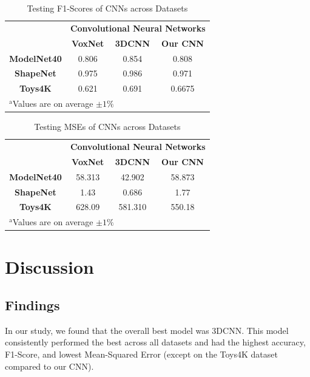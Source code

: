 \documentclass[conference]{IEEEtran}
\newcommand{\ra}[1]{\renewcommand{\arraystretch}{#1}}
\begin{document}
\begin{table}[htbp]
    \caption{Testing F1-Scores of CNNs across Datasets}
    \ra{1.2}
    \begin{center}
    \begin{tabular}{|c|c|c|c|}
    \hline
    &\multicolumn{3}{|c|}{\textbf{Convolutional Neural Networks}} \\
    \cline{2-4}
    & \textbf{VoxNet} & \textbf{3DCNN} & \textbf{Our CNN} \\
    \hline
    \textbf{ModelNet40} & 0.806 & 0.854 & 0.808 \\
    \hline
    \textbf{ShapeNet} & 0.975 & 0.986 & 0.971 \\
    \hline
    \textbf{Toys4K} & 0.621 & 0.691 & 0.6675 \\
    \hline
    \multicolumn{4}{l}{$^{\mathrm{a}}$Values are on average $\pm 1\%$}.
    \end{tabular}
    \label{tab2}
    \end{center}
\end{table}

\begin{table}[htbp]
    \caption{Testing MSEs of CNNs across Datasets}
    \ra{1.2}
    \begin{center}
    \begin{tabular}{|c|c|c|c|}
    \hline
    &\multicolumn{3}{|c|}{\textbf{Convolutional Neural Networks}} \\
    \cline{2-4}
    & \textbf{VoxNet} & \textbf{3DCNN} & \textbf{Our CNN} \\
    \hline
    \textbf{ModelNet40} & 58.313 & 42.902 & 58.873 \\
    \hline
    \textbf{ShapeNet} & 1.43 & 0.686 & 1.77 \\
    \hline
    \textbf{Toys4K} & 628.09 & 581.310 & 550.18 \\
    \hline
    \multicolumn{4}{l}{$^{\mathrm{a}}$Values are on average $\pm 1\%$}.
    \end{tabular}
    \label{tab3}
    \end{center}
\end{table}



\section{Discussion}
\subsection{Findings}
In our study, we found that the overall best model was 3DCNN. This model consistently performed the best across all datasets and had the highest accuracy, F1-Score, and lowest Mean-Squared Error (except on the Toys4K dataset compared to our CNN).
\end{document}
